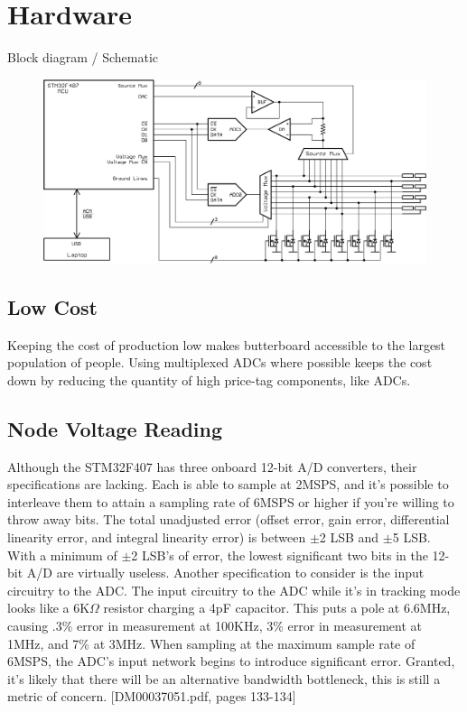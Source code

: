 \documentclass[11pt,twoside]{mitthesis}
\begin{document}
\chapter{Hardware}


Block diagram / Schematic


\begin{figure}[h]
  \begin{center}
      \includegraphics[width=1\textwidth]{../circuit.png}
  \end{center}
\end{figure}
\section{Low Cost}

Keeping the cost of production low makes butterboard accessible to the largest population of people.
Using multiplexed ADCs where possible keeps the cost down by reducing the quantity of high price-tag components, like ADCs.

\section{Node Voltage Reading}

Although the STM32F407 has three onboard 12-bit A/D converters, their specifications are lacking.
Each is able to sample at 2MSPS, and it's possible to interleave them to attain a sampling rate of 6MSPS or higher if you're willing to throw away bits.
The total unadjusted error (offset error, gain error, differential linearity error, and integral linearity error) is between $\pm$2 LSB and $\pm$5 LSB.
With a minimum of $\pm$2 LSB's of error, the lowest significant two bits in the 12-bit A/D are virtually useless.
Another specification to consider is the input circuitry to the ADC.
The input circuitry to the ADC while it's in tracking mode looks like a 6K$\Omega$ resistor charging a 4pF capacitor.
This puts a pole at 6.6MHz, causing .3\% error in measurement at 100KHz, 3\% error in measurement at 1MHz, and 7\% at 3MHz.
When sampling at the maximum sample rate of 6MSPS, the ADC's input network begins to introduce significant error.
Granted, it's likely that there will be an alternative bandwidth bottleneck, this is still a metric of concern.
[DM00037051.pdf, pages 133-134]
\end{document}

